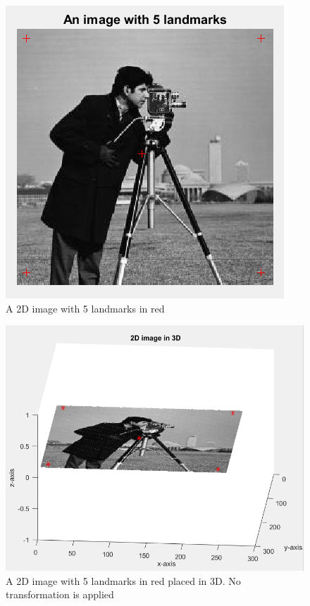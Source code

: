 \documentclass[]{article}
\begin{document}
\begin{figure}[H]
\centering
\includegraphics[scale=1]{Image2D.PNG}
\caption{A 2D image with 5 landmarks in red}
\label{fig:2Dcam}
\end{figure}

\begin{figure}[H]
\centering
\includegraphics[scale=0.75]{image2D3D.PNG}
\caption{A 2D image with 5 landmarks in red placed in 3D. No transformation is applied}
\label{fig:2D3Dcam}
\end{figure}
\end{document}
